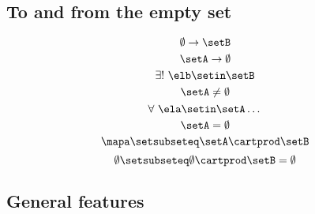 \begin{forslides}
\subsection{To and from the empty set}

\begin{equation}\label{eq:slides_session2_114}
\emptyset \to \setB
\end{equation}
\begin{equation}\label{eq:slides_session2_115}
\setA \to \emptyset
\end{equation}
\begin{equation}\label{eq:slides_session2_116}
\exists ! \ \elb \setin\setB
\end{equation}
\begin{equation}\label{eq:slides_session2_117}
\setA \neq \emptyset
\end{equation}
\begin{equation}\label{eq:slides_session2_118}
\forall \ \ela \setin\setA \dots
\end{equation}
\begin{equation}\label{eq:slides_session2_119}
\setA = \emptyset
\end{equation}
\begin{equation}\label{eq:slides_session2_120}
\mapa \setsubseteq \setA \cartprod \setB
\end{equation}
\begin{equation}\label{eq:slides_session2_121}
\emptyset \setsubseteq \emptyset \cartprod \setB = \emptyset
\end{equation}

\subsection{General features}


\end{forslides}
